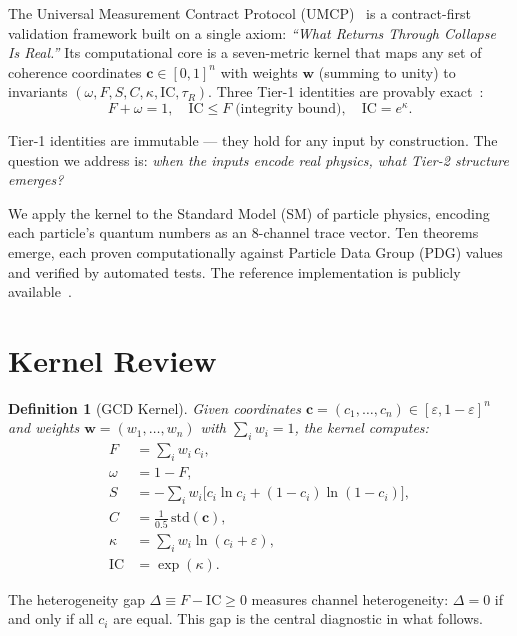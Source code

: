 \documentclass[
  aps,
  prd,
  twocolumn,
  superscriptaddress,
  nofootinbib,
  floatfix
]{revtex4-2}
\newtheorem{definition}[theorem]{Definition}
\newcommand{\eps}{\varepsilon}
\newcommand{\beq}{\begin{equation}}
\newcommand{\eeq}{\end{equation}}
\newcommand{\tvec}{\mathbf{c}}
\newcommand{\wvec}{\mathbf{w}}
\newcommand{\IC}{\mathrm{IC}}
\begin{document}
The Universal Measurement Contract Protocol
(UMCP)~\cite{paulus2025umcp,paulus2025physicscoherence} is a
contract-first validation framework built on a single axiom:
\emph{``What Returns Through Collapse Is Real.''} Its
computational core is a seven-metric kernel that maps any
set of coherence coordinates $\tvec \in [0,1]^n$ with weights
$\wvec$ (summing to unity) to invariants $(\omega, F, S, C,
\kappa, \IC, \tau_R)$.  Three Tier-1 identities are provably
exact~\cite{paulus2026umcpcasepack}:
\beq\label{eq:tier1}
  F + \omega = 1, \quad
  \IC \leq F \;\text{(integrity bound)}, \quad
  \IC = e^{\kappa}.
\eeq

Tier-1 identities are immutable --- they hold for any input
by construction.  The question we address is: \emph{when the
inputs encode real physics, what Tier-2 structure emerges?}

We apply the kernel to the Standard Model (SM) of particle
physics, encoding each particle's quantum numbers as an
8-channel trace vector.  Ten theorems emerge, each proven
computationally against Particle Data Group (PDG) values
and verified by automated tests.  The reference implementation
is publicly available~\cite{umcpmetadatarepo}.

\section{Kernel Review}\label{sec:kernel}

\begin{definition}[GCD Kernel]\label{def:kernel}
Given coordinates $\tvec = (c_1, \ldots, c_n) \in [\eps, 1-\eps]^n$
and weights $\wvec = (w_1, \ldots, w_n)$ with $\sum_i w_i = 1$,
the kernel computes:
\begin{align}
  F &= \sum_i w_i \, c_i, \label{eq:F} \\
  \omega &= 1 - F, \label{eq:omega} \\
  S &= -\sum_i w_i \bigl[c_i \ln c_i + (1{-}c_i)\ln(1{-}c_i)\bigr],
  \label{eq:S} \\
  C &= \frac{1}{0.5}\,\mathrm{std}(\tvec), \label{eq:C} \\
  \kappa &= \sum_i w_i \ln(c_i + \eps), \label{eq:kappa} \\
  \IC &= \exp(\kappa). \label{eq:IC}
\end{align}
\end{definition}

The heterogeneity gap $\Delta \equiv F - \IC \geq 0$ measures channel
heterogeneity: $\Delta = 0$ if and only if all $c_i$ are equal.
This gap is the central diagnostic in what follows.
\end{document}
